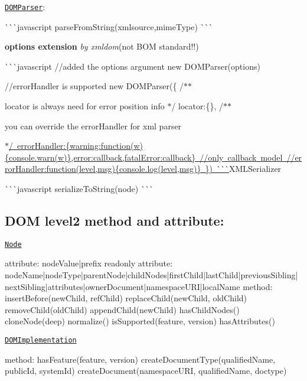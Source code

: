 \begin{DoxyItemize}
\item \href{https://developer.mozilla.org/en/DOMParser}{\tt D\+O\+M\+Parser}\+:

\`{}\`{}\`{}javascript parse\+From\+String(xmlsource,mime\+Type) \`{}\`{}\`{}
\begin{DoxyItemize}
\item {\bfseries options extension} {\itshape by xmldom}(not B\+OM standard!!)
\end{DoxyItemize}

\`{}\`{}\`{}javascript //added the options argument new D\+O\+M\+Parser(options)

//error\+Handler is supported new D\+O\+M\+Parser(\{ /$\ast$$\ast$
\begin{DoxyItemize}
\item locator is always need for error position info $\ast$/ locator\+:\{\}, /$\ast$$\ast$
\item you can override the error\+Handler for xml parser
\item \mbox{\hyperlink{}{$\ast$/ error\+Handler\+:\{warning\+:function(w)\{console.\+warn(w)\},error\+:callback,fatal\+Error\+:callback\} //only callback model //error\+Handler\+:function(level,msg)\{console.\+log(level,msg)\} \})  \`{}\`{}\`{}}}X\+M\+L\+Serializer
\end{DoxyItemize}

\`{}\`{}\`{}javascript serialize\+To\+String(node) \`{}\`{}\`{} \subsection*{D\+OM level2 method and attribute\+: }
\item \href{http://www.w3.org/TR/2000/REC-DOM-Level-2-Core-20001113/core.html#ID-1950641247}{\tt Node} \begin{DoxyVerb} attribute:
     nodeValue|prefix
 readonly attribute:
     nodeName|nodeType|parentNode|childNodes|firstChild|lastChild|previousSibling|nextSibling|attributes|ownerDocument|namespaceURI|localName
 method: 
     insertBefore(newChild, refChild)
     replaceChild(newChild, oldChild)
     removeChild(oldChild)
     appendChild(newChild)
     hasChildNodes()
     cloneNode(deep)
     normalize()
     isSupported(feature, version)
     hasAttributes()
\end{DoxyVerb}

\item \href{http://www.w3.org/TR/2000/REC-DOM-Level-2-Core-20001113/core.html#ID-102161490}{\tt D\+O\+M\+Implementation} \begin{DoxyVerb} method:
     hasFeature(feature, version)
     createDocumentType(qualifiedName, publicId, systemId)
     createDocument(namespaceURI, qualifiedName, doctype)
\end{DoxyVerb}


\end{DoxyItemize}
